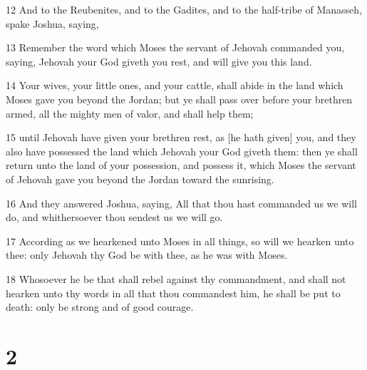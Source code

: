 \par 12 And to the Reubenites, and to the Gadites, and to the half-tribe of Manasseh, spake Joshua, saying,
\par 13 Remember the word which Moses the servant of Jehovah commanded you, saying, Jehovah your God giveth you rest, and will give you this land.
\par 14 Your wives, your little ones, and your cattle, shall abide in the land which Moses gave you beyond the Jordan; but ye shall pass over before your brethren armed, all the mighty men of valor, and shall help them;
\par 15 until Jehovah have given your brethren rest, as [he hath given] you, and they also have possessed the land which Jehovah your God giveth them: then ye shall return unto the land of your possession, and possess it, which Moses the servant of Jehovah gave you beyond the Jordan toward the sunrising.
\par 16 And they answered Joshua, saying, All that thou hast commanded us we will do, and whithersoever thou sendest us we will go.
\par 17 According as we hearkened unto Moses in all things, so will we hearken unto thee: only Jehovah thy God be with thee, as he was with Moses.
\par 18 Whosoever he be that shall rebel against thy commandment, and shall not hearken unto thy words in all that thou commandest him, he shall be put to death: only be strong and of good courage.

\chapter{2}


